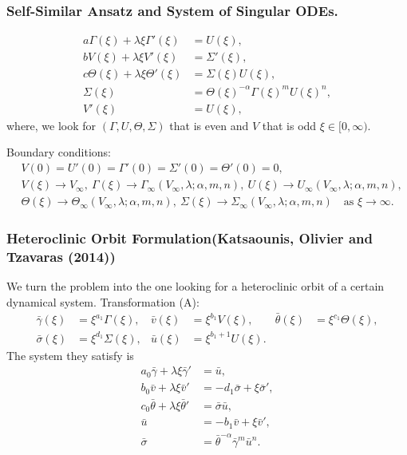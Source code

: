 \documentclass{beamer}
\def\bg{{\bar{\gamma}}}
\def\bv{{\bar{v}}}
\def\bth{{\bar{\theta}}}
\def\bs{{\bar{\sigma}}}
\def\bu{{\bar{u}}}
\begin{document}
\begin{frame}
 \frametitle{Self-Similar Ansatz and System of Singular ODEs.}
\begin{equation} \label{intro:ss-odes}
\begin{aligned}
 a \Gamma(\xi) + \lambda \xi \Gamma'(\xi) &= U(\xi), \\
 b V(\xi) + \lambda \xi V'(\xi) &= \Sigma'(\xi), \\ 
 c \Theta(\xi) + \lambda \xi \Theta'(\xi)&=\Sigma(\xi) U(\xi),\\
 \Sigma(\xi) &= \Theta(\xi)^{-\alpha} \Gamma(\xi)^m U(\xi)^n, \\
 V'(\xi)&=U(\xi),
\end{aligned} 
\end{equation}
where, we look for $(\Gamma,U,\Theta,\Sigma)$ that is even and $V$ that is odd $\xi \in [0,\infty)$. %

\vskip 5pt
Boundary conditions:{\scriptsize
\begin{align*}
 &V(0)=U'(0)=\Gamma'(0)=\Sigma'(0)=\Theta'(0)=0,\\
 &V(\xi)\rightarrow V_\infty, \:\Gamma(\xi) \rightarrow\Gamma_\infty(V_\infty,\lambda;\alpha,m,n), \: U(\xi) \rightarrow U_\infty(V_\infty,\lambda;\alpha,m,n), \\ &\Theta(\xi) \rightarrow\Theta_\infty(V_\infty,\lambda;\alpha,m,n), \:
 \Sigma(\xi) \rightarrow\Sigma_\infty(V_\infty,\lambda;\alpha,m,n) \quad \text{as $\xi \rightarrow \infty$}.
\end{align*}}
\end{frame}

\begin{frame}
 \frametitle{Heteroclinic Orbit Formulation({\footnotesize Katsaounis, Olivier and Tzavaras (2014)})}
 We turn the problem into the one looking for a heteroclinic orbit of a certain dynamical system.
 Transformation (A):\begin{equation} \label{eq:CAPtoBAR}
\begin{aligned}
 \bg(\xi)&=\xi^{a_1}\Gamma(\xi), &
 \bv(\xi)&=\xi^{b_1}V(\xi), &
 \bth(\xi)&=\xi^{c_1}\Theta(\xi), \\
 \bs(\xi)&=\xi^{d_1}\Sigma(\xi), &
 \bu(\xi)&=\xi^{b_1+1}U(\xi).
\end{aligned}
\end{equation}
The system they satisfy is
\begin{equation} \label{eq:barsys}
 \begin{aligned}
  a_0\bg + \lambda\xi\bg' &=\bu,\\
  b_0\bv + \lambda\xi\bv' &=-d_1 \bs + \xi\bs',\\
  c_0\bth+ \lambda\xi\bth'&=\bs\bu,\\
  \bu&=-b_1\bv+\xi\bv',\\
  \bs &=\bth^{-\alpha}\bg^m\bu^n.
 \end{aligned}
\end{equation}
\end{frame}
\end{document}
